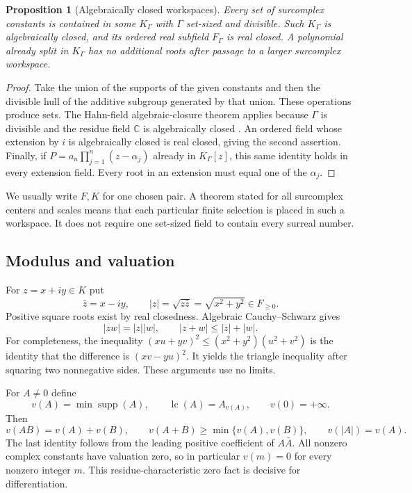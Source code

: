 \documentclass[11pt,letterpaper]{article}
\numberwithin{equation}{section}
\newtheorem{proposition}[theorem]{Proposition}
\theoremstyle{definition}
\theoremstyle{remark}\newtheorem{remark}[theorem]{Remark}
\newcommand{\C}{\mathbb C}
\newcommand{\supp}{\operatorname{supp}}
\newcommand{\lc}{\operatorname{lc}}
\begin{document}
\begin{proposition}[Algebraically closed workspaces]\label{prop:workspace}
Every set of surcomplex constants is contained in some $K_\Gamma$ with
$\Gamma$ set-sized and divisible. Such $K_\Gamma$ is algebraically closed,
and its ordered real subfield $F_\Gamma$ is real closed. A polynomial already
split in $K_\Gamma$ has no additional roots after passage to a larger
surcomplex workspace.
\end{proposition}
\begin{proof}
Take the union of the supports of the given constants and then the divisible
hull of the additive subgroup generated by that union. These operations
produce sets. The Hahn-field algebraic-closure theorem applies because
$\Gamma$ is divisible and the residue field $\C$ is algebraically closed
\cite[Corollary 4]{Poonen}. An ordered field whose extension by $i$ is
algebraically closed is real closed, giving the second assertion.
Finally, if $P=a_n\prod_{j=1}^n(z-\alpha_j)$ already in $K_\Gamma[z]$, this
same identity holds in every extension field. Every root in an extension
must equal one of the $\alpha_j$.
\end{proof}
We usually write $F,K$ for one chosen pair. A theorem stated for all
surcomplex centers and scales means that each particular finite selection
is placed in such a workspace. It does not require one set-sized field to
contain every surreal number.

\subsection{Modulus and valuation}
For $z=x+iy\in K$ put
\[
 \bar z=x-iy,\qquad |z|=\sqrt{z\bar z}=\sqrt{x^2+y^2}\in F_{\ge0}.
\]
Positive square roots exist by real closedness. Algebraic
Cauchy--Schwarz gives
\[
 |zw|=|z||w|,\qquad |z+w|\le |z|+|w|.
\]
For completeness, the inequality
$(xu+yv)^2\le(x^2+y^2)(u^2+v^2)$ is the identity that the difference is
$(xv-yu)^2$. It yields the triangle inequality after squaring two
nonnegative sides. These arguments use no limits.

For $A\ne0$ define
\[
 v(A)=\min\supp(A),\qquad \lc(A)=A_{v(A)},\qquad v(0)=+\infty.
\]
Then
\begin{equation}\label{eq:valuation}
 v(AB)=v(A)+v(B),\qquad
 v(A+B)\ge\min\{v(A),v(B)\},\qquad v(|A|)=v(A).
\end{equation}
The last identity follows from the leading positive coefficient of
$A\bar A$. All nonzero complex constants have valuation zero, so in
particular $v(m)=0$ for every nonzero integer $m$. This residue-characteristic
zero fact is decisive for differentiation.
\end{document}
